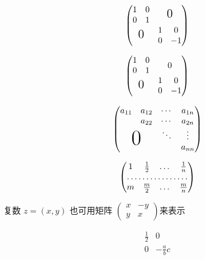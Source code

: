\documentclass{ctexart}
\begin{document}
	\[
	\begin{pmatrix}
		\begin{matrix}	1 & 0 \\0 & 1	\end{matrix} 	
		& 	\text{\Large 0} \\
		\text{\Large 0} & 	\begin{matrix}
			1 & 0 \\0 & -1	\end{matrix}
	\end{pmatrix}
	\]
	
	\[
	\begin{pmatrix}
		\begin{matrix}
			1 & 0 \\
			0 & 1
		\end{matrix} 	& 	\Large 0 \\
		\text{\Large 0} & 	\begin{matrix}
			1 & 0 \\
			0 & -1
		\end{matrix}
	\end{pmatrix}
	\]
	
	\[
	\begin{pmatrix}
		a_{11}			& a_{12}							& \cdots	& a_{1n} \\
						& a_{22}							& \cdots	& a_{2n} \\
						&									& \ddots	& \vdots \\
		\multicolumn{2}{c}{\raisebox{1.3ex}[0pt]{\Huge 0}}	&			& a_{nn} %
	\end{pmatrix}
	\]
	
	\[
	\begin{pmatrix}
		1	& \frac 12	& \dots	& \frac 1n 	\\
		\hdotsfor{4}							\\
		m	& \frac m2	& \dots	& \frac mn
	\end{pmatrix}
	\]
	
	复数 $z=(x,y)$ 也可用矩阵
	\begin{math}
		\left(
			\begin{smallmatrix}
				x	& -y	\\
				y	& x
			\end{smallmatrix}
		\right)	
	\end{math}来表示
	
	\[
	\begin{array}{r|r} 					%
		\frac12		& 0				\\	%
		\hline							%
		0			& -\frac abc	\\
	\end{array}
	\]
	
\end{document}
